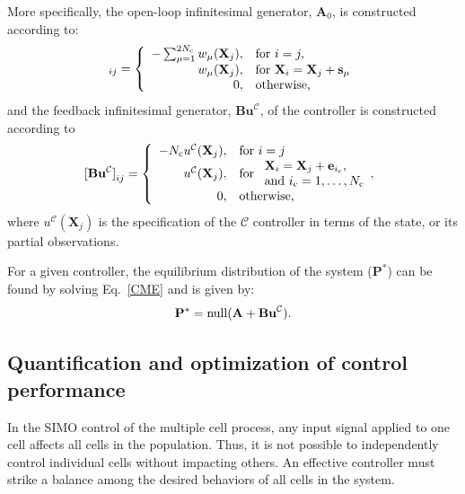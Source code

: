\documentclass[12pt]{article}
\begin{document}
More specifically, the open-loop infinitesimal generator, $\mathbf{A}_0$, is constructed according to:
\begin{equation}
[\mathbf{A}_0]_{ij} = \left\{
\begin{array}{rl}
-\sum_{\mu =1}^{2N_{\rm c}} w_{\mu}(\mathbf{X}_j), &\text{for }i=j,\\
w_{\mu}(\mathbf{X}_j), &\text{for }\mathbf{X}_i = \mathbf{X}_j+\mathbf{s}_\mu\\
0, & \text{otherwise,}
\end{array}\right. 
\label{InfA}
\end{equation}
and the feedback infinitesimal generator, $\mathbf{Bu}^{\mathcal{C}}$, of the controller is constructed according to
\begin{equation}
[\mathbf{Bu^{\mathcal{C}}]}_{ij} = \left\{
\begin{array}{rl}
- N_{\rm c}{u}^{\mathcal{C}}(\mathbf{X}_j), &\text{for }i=j\\
{u}^{\mathcal{C}}(\mathbf{X}_j), &\text{for }\begin{array}{ll}\mathbf{X}_i =\mathbf{X}_j + \mathbf{e}_{i_{\rm c}}, \\ \text{and } i_{\rm c} = 1,\ldots,N_{\rm c}\end{array},\\
0, & \text{otherwise,}
\end{array}\right.
\label{InfB}
\end{equation}
where ${u}^{\mathcal{C}}(\mathbf{X}_j)$ is the specification of the $\mathcal{C}$ controller in terms of the state, or its partial observations.

For a given controller, the equilibrium distribution of the system ($\mathbf{P}^*$) can be found by solving Eq.\ \ref{CME} and is given by:
\begin{equation}
\mathbf{P}^*={\rm null}(\mathbf{A}+\textbf{Bu}^{\mathcal{C}}).\label{SSDist}
\end{equation}


\subsection{Quantification and optimization of control performance}

In the SIMO control of the multiple cell process, any input signal applied to one cell affects all cells in the population. Thus, it is not possible to independently control individual cells without impacting others. An effective controller must strike a balance among the desired behaviors of all cells in the system.
\end{document}
